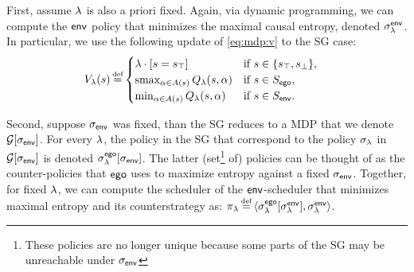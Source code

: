 
First, assume $\lambda$ is also a priori fixed.  
Again, via dynamic programming, we can compute the
$\mathsf{env}$ policy that minimizes the maximal causal entropy, denoted $\sigma_\lambda^{\mathsf{env}}$.
In particular, we use the following update of \eqref{eq:mdp:v} to the SG case:
 \begin{align}
   & V_\rat(s) \eqdef  \begin{cases}
     \lambda  \cdot \indicator{s = \target} & \text{if }s \in \{ \target, \sink \},\\
     \smoothmax_{\act \in \EnAct(s)}{  Q_\rat(s,\act) } & \text{if } s \in S_\pOne, \\
     \min_{\act \in \EnAct(s)}{  Q_\rat(s,\act) } &  \text{if } s \in S_\pTwo.
   \end{cases}
 \end{align}

Second, suppose ${\sigma_{\mathsf{env}}}$ was fixed, than the SG reduces to 
a MDP that we denote $\mathcal{G}[{\sigma_{\mathsf{env}}}]$.
For every $\lambda$, the policy in the SG that correspond to the policy $\sigma_\lambda$ in $\mathcal{G}[{\sigma_{\mathsf{env}}}]$ is denoted $\sigma^{\mathsf{ego}}_\lambda[{\sigma_{\mathsf{env}}}]$.
The latter (set\footnote{These policies are no longer unique because some parts of the SG may be unreachable under ${\sigma_{\mathsf{env}}}$} of) policies can be thought of as the counter-policies that $\mathsf{ego}$ uses to maximize entropy against a fixed ${\sigma_{\mathsf{env}}}$. 
Together, for fixed $\lambda$, we can compute the scheduler of the $\mathsf{env}$-scheduler that minimizes maximal entropy and its counterstrategy as: $\pi_\rat \eqdef \langle
\sched^\pOne_\rat[\sched_\rat^\pTwo] , \sched_\rat^\pTwo \rangle$.
%

